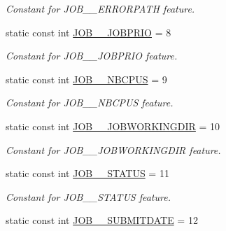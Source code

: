 \begin{DoxyCompactItemize}
\begin{DoxyCompactList}\small\item\em Constant for JOB\_\-\_\-ERRORPATH feature. \item\end{DoxyCompactList}\item 
\hypertarget{classTMS__Data_1_1TMS__DataPackage_a12211885bf7eced799a0013060864ba6}{
static const int \hyperlink{classTMS__Data_1_1TMS__DataPackage_a12211885bf7eced799a0013060864ba6}{JOB\_\-\_\-JOBPRIO} = 8}
\label{classTMS__Data_1_1TMS__DataPackage_a12211885bf7eced799a0013060864ba6}

\begin{DoxyCompactList}\small\item\em Constant for JOB\_\-\_\-JOBPRIO feature. \item\end{DoxyCompactList}\item 
\hypertarget{classTMS__Data_1_1TMS__DataPackage_a75bfb072d81c8539bdf24a9ddca710d3}{
static const int \hyperlink{classTMS__Data_1_1TMS__DataPackage_a75bfb072d81c8539bdf24a9ddca710d3}{JOB\_\-\_\-NBCPUS} = 9}
\label{classTMS__Data_1_1TMS__DataPackage_a75bfb072d81c8539bdf24a9ddca710d3}

\begin{DoxyCompactList}\small\item\em Constant for JOB\_\-\_\-NBCPUS feature. \item\end{DoxyCompactList}\item 
\hypertarget{classTMS__Data_1_1TMS__DataPackage_afb0fc900e827873be15ea401eb21bbcd}{
static const int \hyperlink{classTMS__Data_1_1TMS__DataPackage_afb0fc900e827873be15ea401eb21bbcd}{JOB\_\-\_\-JOBWORKINGDIR} = 10}
\label{classTMS__Data_1_1TMS__DataPackage_afb0fc900e827873be15ea401eb21bbcd}

\begin{DoxyCompactList}\small\item\em Constant for JOB\_\-\_\-JOBWORKINGDIR feature. \item\end{DoxyCompactList}\item 
\hypertarget{classTMS__Data_1_1TMS__DataPackage_a799cea6c9df075efcf81753d7ff9659d}{
static const int \hyperlink{classTMS__Data_1_1TMS__DataPackage_a799cea6c9df075efcf81753d7ff9659d}{JOB\_\-\_\-STATUS} = 11}
\label{classTMS__Data_1_1TMS__DataPackage_a799cea6c9df075efcf81753d7ff9659d}

\begin{DoxyCompactList}\small\item\em Constant for JOB\_\-\_\-STATUS feature. \item\end{DoxyCompactList}\item 
\hypertarget{classTMS__Data_1_1TMS__DataPackage_a23d7fcb851b39c3377e81eb80d7d5433}{
static const int \hyperlink{classTMS__Data_1_1TMS__DataPackage_a23d7fcb851b39c3377e81eb80d7d5433}{JOB\_\-\_\-SUBMITDATE} = 12}
\label{classTMS__Data_1_1TMS__DataPackage_a23d7fcb851b39c3377e81eb80d7d5433}


\end{DoxyCompactItemize}
